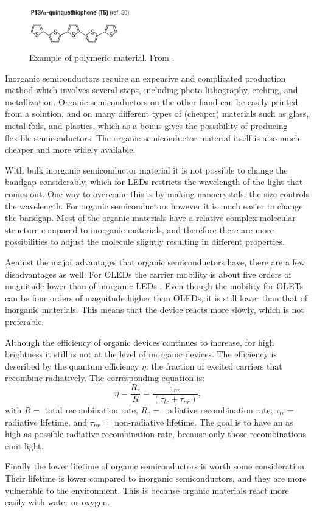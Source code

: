 \begin{figure}[!ht]
 \begin{center}
  \includegraphics[width=0.4\textwidth]{zwavelbenzeen}
  \caption{Example of polymeric material. From \citet{Muccini}.}
  \label{fig:zwavelbenzeen}
 \end{center}
\end{figure}

Inorganic semiconductors require an expensive and complicated production method which involves several steps, including photo-lithography, etching, and metallization. Organic semiconductors on the other hand can be easily printed from a solution, and on many different types of (cheaper) materials such as glass, metal foils, and plastics, which as a bonus gives the possibility of producing flexible semiconductors. The organic semiconductor material itself is also much cheaper and more widely available.

With bulk inorganic semiconductor material it is not possible to change the bandgap considerably, which for LEDs restricts the wavelength of the light that comes out. One way to overcome this is by making nanocrystals: the size controls the wavelength. For organic semiconductors however it is much easier to change the bandgap. Most of the organic materials have a relative complex molecular structure compared to inorganic materials, and therefore there are more possibilities to adjust the molecule slightly resulting in different properties.

Against the major advantages that organic semiconductors have, there are a few disadvantages as well. For OLEDs the carrier mobility is about five orders of magnitude lower than of inorganic LEDs \citep{Muccini}. Even though the mobility for OLETs can be four orders of magnitude higher than OLEDs, it is still lower than that of inorganic materials. This means that the device reacts more slowly, which is not preferable.

Although the efficiency of organic devices continues to increase, for high brightness it still is not at the level of inorganic devices. The efficiency is described by the quantum efficiency $\eta$: the fraction of excited carriers that recombine radiatively. The corresponding equation is:
\[
 \eta = \frac{R_{r}}{R} = \frac{\tau_{nr}}{(\tau_{tr}+\tau_{nr})},
\]
with $R=$ total recombination rate, $R_{r}=$ radiative recombination rate, $\tau_{tr}=$ radiative lifetime, and $\tau_{nr}=$ non-radiative lifetime. The goal is to have an as high as possible radiative recombination rate, because only those recombinations emit light.

Finally the lower lifetime of organic semiconductors is worth some consideration. Their lifetime is lower compared to inorganic semiconductors, and they are more vulnerable to the environment. This is because organic materials react more easily with water or oxygen. 
